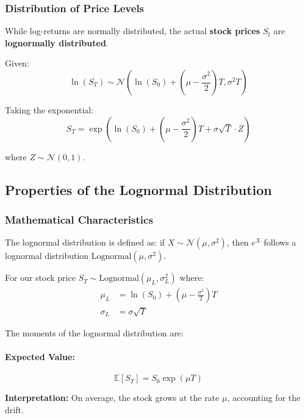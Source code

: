 \documentclass[12pt,a4paper]{article}
\begin{document}
\subsubsection{Distribution of Price Levels}

While log-returns are normally distributed, the actual \textbf{stock prices} $S_t$ are \textbf{lognormally distributed}. 

Given:
\begin{equation}
\ln(S_T) \sim \mathcal{N}\left(\ln(S_0) + \left(\mu - \frac{\sigma^2}{2}\right)T, \sigma^2 T\right)
\end{equation}

Taking the exponential:
\begin{equation}
S_T = \exp\left(\ln(S_0) + \left(\mu - \frac{\sigma^2}{2}\right)T + \sigma \sqrt{T} \cdot Z\right)
\end{equation}

where $Z \sim \mathcal{N}(0,1)$.

\subsection{Properties of the Lognormal Distribution}

\subsubsection{Mathematical Characteristics}

The lognormal distribution is defined as: if $X \sim \mathcal{N}(\mu, \sigma^2)$, then $e^X$ follows a lognormal distribution $\text{Lognormal}(\mu, \sigma^2)$.

For our stock price $S_T \sim \text{Lognormal}(\mu_L, \sigma_L^2)$ where:
\begin{align}
\mu_L &= \ln(S_0) + \left(\mu - \frac{\sigma^2}{2}\right)T \\
\sigma_L &= \sigma\sqrt{T}
\end{align}

The moments of the lognormal distribution are:

\paragraph{Expected Value:}
\begin{equation}
\mathbb{E}[S_T] = S_0 \exp(\mu T)
\end{equation}

\textbf{Interpretation:} On average, the stock grows at the rate $\mu$, accounting for the drift.
\end{document}

